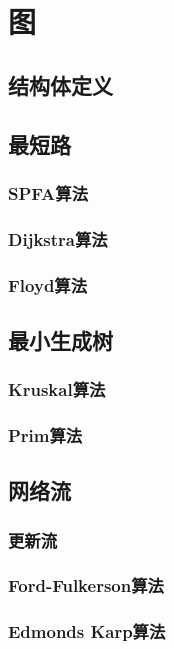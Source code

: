 
\section{图}
\subsection{结构体定义}

\subsection{最短路}
\subsubsection{SPFA算法}
\subsubsection{Dijkstra算法}
\subsubsection{Floyd算法}

\subsection{最小生成树}
\subsubsection{Kruskal算法}
\subsubsection{Prim算法}

\subsection{网络流}
\subsubsection{更新流}
\subsubsection{Ford-Fulkerson算法}
\subsubsection{Edmonds Karp算法}

